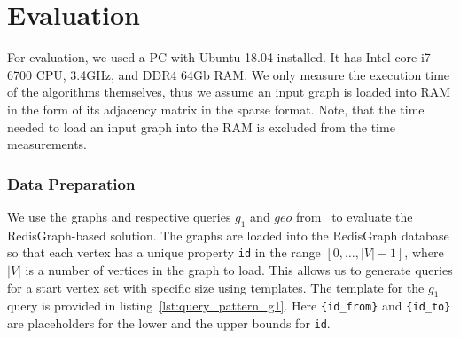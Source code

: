 \section{Evaluation}

For evaluation, we used a PC with Ubuntu 18.04 installed.
It has Intel core i7-6700 CPU, 3.4GHz, and DDR4 64Gb RAM.
We only measure the execution time of the algorithms themselves, thus we assume an input graph is loaded into RAM in the form of its adjacency matrix in the sparse format.
Note, that the time needed to load an input graph into the RAM is excluded from the time measurements.

\subsubsection{Data Preparation}

We use the graphs and respective queries $g_1$ and $geo$ from~\cite{10.1145/3398682.3399163} to evaluate the RedisGraph-based solution.
The graphs are loaded into the RedisGraph database so that each vertex has a unique property \verb|id| in the range $[0, \ldots, |V|-1]$, where $|V|$ is a number of vertices in the graph to load.
This allows us to generate queries for a start vertex set with specific size using templates.
The template for the $g_1$ query is provided in listing~\ref{lst:query_pattern_g1}.
Here \texttt{\{id\_from\}} and \texttt{\{id\_to\}} are placeholders for the lower and the upper bounds for \verb|id|.

\begin{algorithm}
\end{algorithm}

